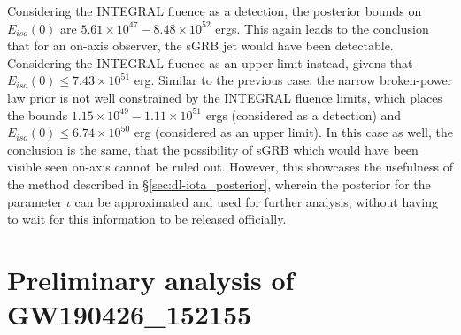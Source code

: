     Considering the INTEGRAL fluence as a detection, the posterior bounds on
    $E_{iso}(0)$ are $5.61 \times 10^{47} - 8.48 \times 10^{52}$ ergs. This again leads
    to the conclusion that for an on-axis observer, the sGRB jet would have been
    detectable. Considering the INTEGRAL fluence as an upper limit instead, givens that
    $E_{iso}(0) \leq 7.43 \times 10^{51}$ erg.  Similar to the previous case, the narrow
    broken-power law prior is not well constrained by the INTEGRAL fluence limits, which
    places the bounds $1.15 \times 10^{49}-1.11 \times 10^{51}$ ergs (considered as a
    detection) and $E_{iso}(0) \leq 6.74 \times 10^{50}$ erg (considered as an upper
    limit). In this case as well, the conclusion is the same, that the possibility of
    sGRB which would have been visible seen on-axis cannot be ruled out. However, this
    showcases the usefulness of the method described in \S \ref{sec:dl-iota_posterior},
    wherein the posterior for the parameter $\iota$ can be approximated and used for
    further analysis, without having to wait for this information to be released
    officially.

\section{Preliminary analysis of GW190426\_152155}\label{sec:190426}


